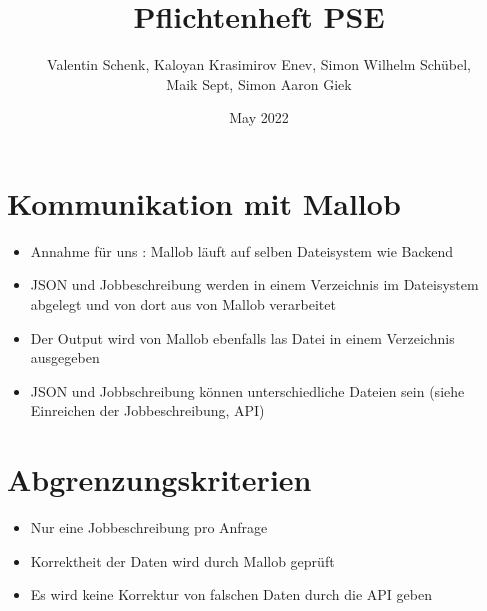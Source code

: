 


\title{Pflichtenheft PSE}
\author{Valentin Schenk, Kaloyan Krasimirov Enev, Simon Wilhelm Schübel,\\ Maik Sept, Simon Aaron Giek}

\date{May 2022}




\maketitle

\newpage
\tableofcontents 
\newpage

\newpage

\newpage

\newpage

\newpage

\newpage

\newpage

\newpage

\newpage

\newpage




\section{Kommunikation mit Mallob}

\begin{itemize}
    \item Annahme für uns : Mallob läuft auf selben Dateisystem wie Backend 
    \item JSON und Jobbeschreibung werden in einem Verzeichnis im Dateisystem abgelegt und von dort aus von Mallob verarbeitet
    \item Der Output wird von Mallob ebenfalls las Datei in einem Verzeichnis ausgegeben
    \item JSON und Jobbschreibung können unterschiedliche Dateien sein (siehe Einreichen der Jobbeschreibung, API)
\end{itemize}



\section{Abgrenzungskriterien}
    \begin{itemize}
        \item Nur eine Jobbeschreibung pro Anfrage
        \item Korrektheit der Daten wird durch Mallob geprüft
        \item Es wird keine Korrektur von falschen Daten durch die API geben
    \end{itemize}










\printnoidxglossaries

